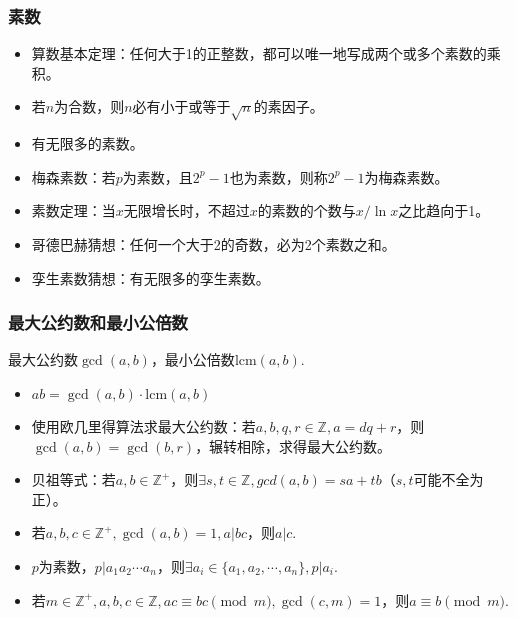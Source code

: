 \subsubsection*{素数}
\begin{itemize}
    \item 算数基本定理：任何大于1的正整数，都可以唯一地写成两个或多个素数的乘积。
    \item 若$n$为合数，则$n$必有小于或等于$\sqrt n$的素因子。
    \item 有无限多的素数。
    \item 梅森素数：若$p$为素数，且$2^p - 1$也为素数，则称$2^p - 1$为梅森素数。
    \item 素数定理：当$x$无限增长时，不超过$x$的素数的个数与$x / \ln x$之比趋向于1。
    \item 哥德巴赫猜想：任何一个大于2的奇数，必为2个素数之和。
    \item 孪生素数猜想：有无限多的孪生素数。
\end{itemize}

\subsubsection*{最大公约数和最小公倍数}
最大公约数$\gcd(a,b)$，最小公倍数$\mathrm{lcm} (a, b)$.
\begin{itemize}
    \item $ab = \gcd (a,b) \cdot \mathrm{lcm} (a,b)$
    \item 使用欧几里得算法求最大公约数：若$a,b,q,r \in \mathbb Z, a = dq +r$，则$\gcd(a,b) = \gcd(b,r)$，辗转相除，求得最大公约数。
    \item 贝祖等式：若$a, b \in \mathbb Z^+$，则$\exists s, t \in \mathbb Z, gcd(a,b) = sa + tb$（$s,t$可能不全为正）。
    \item 若$a, b, c \in \mathbb Z^+, \gcd(a,b) = 1, a|bc$，则$a|c$.
    \item $p$为素数，$p|a_1a_2 \cdots a_n$，则$\exists a_i \in \{a_1, a_2, \cdots ,a_n\} ,p|a_i$.
    \item 若$m \in \mathbb Z^+, a,b,c \in \mathbb Z, ac \equiv bc \pmod m, \gcd(c,m) = 1$，则$a \equiv b \pmod m$.
\end{itemize}

